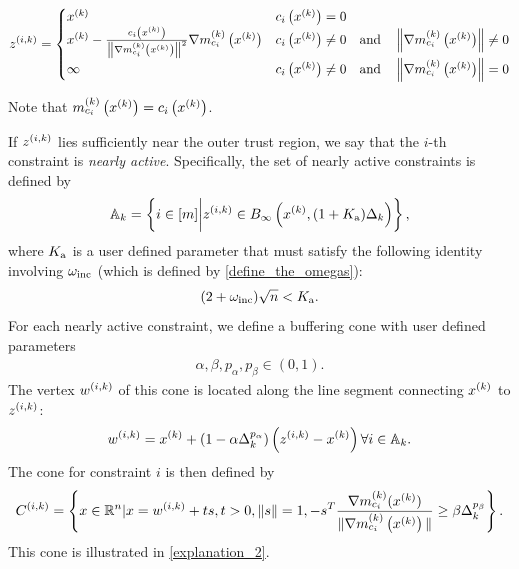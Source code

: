 \begin{align}
\label{define_z}
{z^{(i, k)}} =
\begin{cases}
x^{(k)} &  c_i\left(x^{(k)}\right) = 0 \\
x^{(k)} - \frac{c_i\left(x^{(k)}\right)}{\left\|{\nabla m_{c_i}^{(k)}\left(x^{(k)}\right)}\right\|^2} {\nabla m_{c_i}^{(k)}\left(x^{(k)}\right)} & c_i\left(x^{(k)}\right) \ne 0 \quad \textrm{and} \quad \left\|{\nabla m_{c_i}^{(k)}\left(x^{(k)}\right)}\right\| \ne 0 \\
\mathbf{\infty} & c_i\left(x^{(k)}\right) \ne 0 \quad \textrm{and} \quad \left\|{\nabla m_{c_i}^{(k)}\left(x^{(k)}\right)}\right\| = 0 \\
\end{cases}
\end{align}
\begin{boxedcomment}
Note that $m^{(k)}_{c_i}\left(x^{(k)}\right) = c_i\left(x^{(k)}\right)$.
\end{boxedcomment}
If ${z^{(i, k)}}$ lies sufficiently near the outer trust region, we say that the $i$-th constraint is \emph{nearly active}.
Specifically, the set of nearly active constraints is defined by
\begin{align}
{\mathbb A_{k}} = \left\{i \in [m] \bigg| {z^{(i, k)}} \in B_{\infty}\left(x^{(k)}, (1+{ K_{\textrm{a}} })\Delta_k\right)\right\}, \label{define_activeconstraints}
\end{align}
where ${ K_{\textrm{a}} }$ is a user defined parameter that must satisfy the following identity involving $\omega_{\text{inc}}$ (which is defined by \cref{define_the_omegas}):
\begin{align}
(2 + \omega_{\text{inc}})\sqrt{n} < { K_{\textrm{a}} }. \label{define_zikthresh}
\end{align}
For each nearly active constraint, we define a buffering cone with user defined parameters
\begin{align}
\alpha, \beta, p_{\alpha}, p_{\beta} \in (0, 1). \label{define_abpab}
\end{align}
The vertex ${w^{(i, k)}}$ of this cone is located along the line segment connecting $x^{(k)}$ to ${z^{(i, k)}}$:
\begin{align}
{w^{(i, k)}} = x^{(k)} + \left(1 - \alpha\Delta_k^{p_{\alpha}}\right)\left({z^{(i, k)}} - x^{(k)}\right) \forall i \in {\mathbb A_{k}}. \label{define_w}
\end{align}
The cone for constraint $i$ is then defined by
\begin{align}
{C^{(i, k)}} = \left\{x \in \mathbb R^n | x = {w^{(i, k)}} + t s,t > 0, \|s\| = 1, -s^T{\frac{\nabla m^{(k)}_{c_i}(x^{(k)})}{\|\nabla m^{(k)}_{c_i}\left(x^{(k)}\right)\|}} \ge \beta \Delta_k^{p_{\beta}} \right\}. \label{define_fik}
\end{align}
This cone is illustrated in \cref{explanation_2}.
